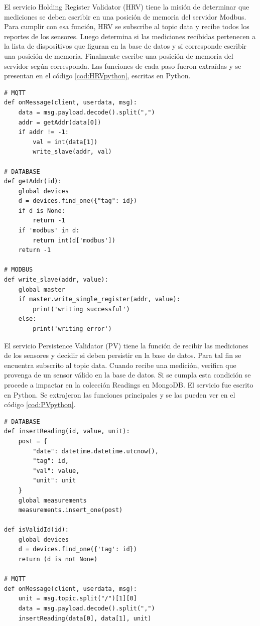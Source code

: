 El servicio Holding Register Validator (HRV) tiene la misión de determinar que mediciones se deben escribir en una posición de memoria del servidor Modbus.
Para cumplir con esa función, HRV se subscribe al topic data y recibe todos los reportes de los sensores.
Luego determina si las mediciones recibidas pertenecen a la lista de dispositivos que figuran en la base de datos y si corresponde escribir una posición de memoria.
Finalmente escribe una posición de memoria del servidor según corresponda.
Las funciones de cada paso fueron extraídas y se presentan en el código \ref{cod:HRVpython}, escritas en Python.

\begin{lstlisting}[label=cod:HRVpython,caption=Funciones principales del servicio HRV]
# MQTT
def onMessage(client, userdata, msg):
    data = msg.payload.decode().split(",")
    addr = getAddr(data[0])
    if addr != -1:
        val = int(data[1])
        write_slave(addr, val)
        
# DATABASE
def getAddr(id):
    global devices
    d = devices.find_one({"tag": id})
    if d is None:
        return -1
    if 'modbus' in d:
        return int(d['modbus'])
    return -1

# MODBUS
def write_slave(addr, value):
    global master
    if master.write_single_register(addr, value):
        print('writing successful')
    else:
        print('writing error')
\end{lstlisting}

El servicio Persistence Validator (PV) tiene la función de recibir las mediciones de los sensores y decidir si deben persistir en la base de datos.
Para tal fin se encuentra subscrito al topic data.
Cuando recibe una medición, verifica que provenga de un sensor válido en la base de datos.
Si se cumpla esta condición se procede a impactar en la colección Readings en MongoDB.
El servicio fue escrito en Python.
Se extrajeron las funciones principales y se las pueden ver en el código \ref{cod:PVpython}.

\newpage

\begin{lstlisting}[label=cod:PVpython,caption=Funciones principales del servicio PV]
# DATABASE
def insertReading(id, value, unit):
    post = {
        "date": datetime.datetime.utcnow(),
        "tag": id,
        "val": value,
        "unit": unit
    }
    global measurements
    measurements.insert_one(post)

def isValidId(id):
    global devices
    d = devices.find_one({'tag': id})
    return (d is not None)
    
# MQTT
def onMessage(client, userdata, msg):
    unit = msg.topic.split("/")[1][0]
    data = msg.payload.decode().split(",")
    insertReading(data[0], data[1], unit)    
\end{lstlisting}
	
